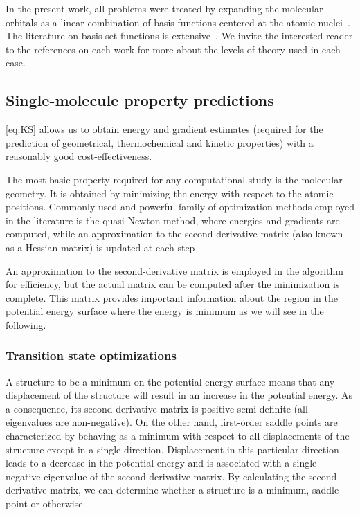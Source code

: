 In the present work, all problems were treated by expanding the molecular
orbitals as a linear combination of basis functions centered at the atomic
nuclei~\cite{Szabo_1996,Helgaker_1997,Jensen_2012,Hill_2012}.
The literature on basis set functions is extensive~\cite{Ditchfield_1971,Hehre_1972,Hariharan_1973,Hariharan_1974,Gordon_1980,Francl_1982,Clark_1983,Frisch_1984,Binning_1990,Blaudeau_1997,Rassolov_1998,Rassolov_2001}.
We invite the interested reader to the references on each work for more about
the levels of theory used in each case.

\subsection{Single-molecule property predictions}\label{sec:optimizations}

\autoref{eq:KS} allows us to obtain energy and gradient estimates (required for
the prediction of geometrical, thermochemical and kinetic properties) with a
reasonably good cost-effectiveness.

The most basic property required for any computational study is the molecular
geometry.
It is obtained by minimizing the energy with respect to the atomic positions.
Commonly used and powerful family of optimization methods employed in the
literature is the quasi-Newton method, where energies and gradients are
computed, while an approximation to the second-derivative matrix (also known as
a Hessian matrix) is updated at each step~\cite{Banerjee_1985,Schlegel_1987}.

An approximation to the second-derivative matrix is employed in the algorithm
for efficiency, but the actual matrix can be computed after the minimization is
complete.
This matrix provides important information about the region in the potential
energy surface where the energy is minimum as we will see in the following.

\subsubsection{Transition state optimizations}\label{sec:ts-optimizations}

A structure to be a minimum on the potential energy surface means that any
displacement of the structure will result in an increase in the potential
energy.
As a consequence, its second-derivative matrix
is positive semi-definite (all eigenvalues are non-negative).
On the other hand, first-order saddle points are characterized by behaving as
a minimum with respect to all displacements of the structure except in a single
direction.
Displacement in this particular direction leads to a decrease in the potential
energy and is associated with a single negative eigenvalue of the
second-derivative matrix.
By calculating the second-derivative matrix, we can determine whether a structure
is a minimum, saddle point or otherwise.

